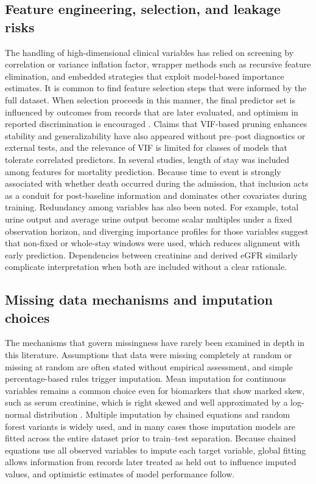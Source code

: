 \subsection{Feature engineering, selection, and leakage risks}
The handling of high-dimensional clinical variables has relied on screening by correlation or variance inflation factor, wrapper methods such as recursive feature elimination, and embedded strategies that exploit model-based importance estimates. It is common to find feature selection steps that were informed by the full dataset. When selection proceeds in this manner, the final predictor set is influenced by outcomes from records that are later evaluated, and optimism in reported discrimination is encouraged \citep{Kang_Yoon_2023}. Claims that VIF-based pruning enhances stability and generalizability have also appeared without pre--post diagnostics or external tests, and the relevance of VIF is limited for classes of models that tolerate correlated predictors. In several studies, length of stay was included among features for mortality prediction. Because time to event is strongly associated with whether death occurred during the admission, that inclusion acts as a conduit for post-baseline information and dominates other covariates during training. Redundancy among variables has also been noted. For example, total urine output and average urine output become scalar multiples under a fixed observation horizon, and diverging importance profiles for those variables suggest that non-fixed or whole-stay windows were used, which reduces alignment with early prediction. Dependencies between creatinine and derived eGFR similarly complicate interpretation when both are included without a clear rationale.

\subsection{Missing data mechanisms and imputation choices}
The mechanisms that govern missingness have rarely been examined in depth in this literature. Assumptions that data were missing completely at random or missing at random are often stated without empirical assessment, and simple percentage-based rules trigger imputation. Mean imputation for continuous variables remains a common choice even for biomarkers that show marked skew, such as serum creatinine, which is right skewed and well approximated by a log-normal distribution \citep{Haeckel_2010}. Multiple imputation by chained equations and random forest variants is widely used, and in many cases those imputation models are fitted across the entire dataset prior to train--test separation. Because chained equations use all observed variables to impute each target variable, global fitting allows information from records later treated as held out to influence imputed values, and optimistic estimates of model performance follow.

